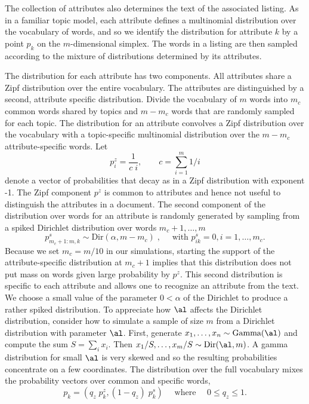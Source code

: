 \documentclass[12pt]{article}
\begin{document}
The collection of attributes also determines the text of the associated listing.  As in a familiar topic model, each attribute defines a multinomial distribution over the vocabulary of words, and so we identify the distribution for attribute $k$ by a point $p_k$ on the $m$-dimensional simplex.  The words in a listing are then sampled according to the mixture of distributions determined by its attributes.  


The distribution for each attribute has two components.  All attributes share a Zipf distribution over the entire vocabulary.  The attributes are distinguished by a second, attribute specific distribution.  Divide the vocabulary of $m$ words into $m_c$ common words shared by topics and $m - m_c$ words that are randomly sampled for each topic.  The distribution for an attribute convolves a Zipf distribution over the vocabulary with a topic-specific multinomial distribution over the $m - m_c$ attribute-specific words. Let 
\begin{equation*}
     p^z_i = \frac{1}{c\;i}, \qquad c = \sum_{i=1}^{m} 1/i 
\end{equation*}
denote a vector of probabilities that decay as in a Zipf distribution with exponent -1. The Zipf component $p^z$ is common to attributes and hence not useful to distinguish the attributes in a document. The second component of the distribution over words for an attribute is randomly generated by  sampling from a spiked Dirichlet distribution over words $m_c+1, \ldots,m$  
 \begin{equation}
     p^s_{m_c+1:m,k} \sim  \mbox{Dir}(\alpha,m-m_c)  \;, \quad \mbox{ with } p^s_{ik} = 0, i = 1,\ldots,m_c.
\label{eq:ps}
\end{equation}
Because we set $m_c = m/10$ in our simulations,  starting the support of the attribute-specific distribution at $m_c+1$ implies that this distribution does not put mass on words given large probability by $p^z$. This second distribution is specific to each attribute and allows one to recognize an attribute from the text.  We choose a small value of the parameter $0 < \alpha$ of the Dirichlet to produce a rather spiked distribution.   To appreciate how $\al$ affects the Dirichlet distribution, consider how to simulate a sample of size $m$ from a Dirichlet distribution with parameter $\al$.  First, generate $x_1,\ldots,x_n \sim \mbox{Gamma}(\al)$ and compute the sum $S = \sum_i x_i$.  Then $x_1/S,\ldots,x_m/S \sim \mbox{Dir}(\al,m)$.  A gamma distribution for small $\al$ is very skewed and so the resulting probabilities concentrate on a few coordinates. The distribution over the full vocabulary mixes the probability vectors over common and specific words, 
\begin{equation}
  p_k = (q_z \; p_k^z, (1-q_z) \; p_k^s)  \quad \mbox{ where } \quad 0 \le q_z \le 1.
  \label{eq:pk}
\end{equation}
\end{document}
